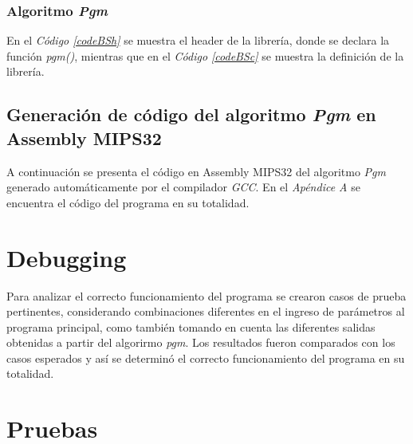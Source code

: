 \documentclass{article}
\newcommand{\refcode}[1]{\textit{Código \ref{#1}}}
\begin{document}
\subsubsection{Algoritmo \textit{Pgm}}

	En el \refcode{codeBSh} se muestra el header de la librería, donde se declara la función \textit{pgm()}, mientras que en el \refcode{codeBSc} se muestra la definición de la librería.

\lstset{ language = C } %
 
\medskip


\lstset{ language = C } %
 
\bigskip\bigskip




\subsection{Generación de código del algoritmo \textit{Pgm} en Assembly MIPS32}

	A continuación se presenta el código en Assembly MIPS32 del algoritmo \textit{Pgm} generado automáticamente por el compilador \textit{GCC}. En el \textit{Apéndice A}	 se encuentra el código del programa en su totalidad.
	\medskip

\lstset{ language = [mips]Assembler } %
 
\bigskip\bigskip



\section{Debugging}
	
	Para analizar el correcto funcionamiento del programa se crearon casos de prueba pertinentes, considerando combinaciones diferentes en el ingreso de parámetros al programa principal, como también tomando en cuenta las diferentes salidas obtenidas a partir del algorirmo \textit{pgm}. Los resultados fueron comparados con los casos esperados y así se determinó el correcto funcionamiento del programa en su totalidad.
\bigskip\bigskip




\section{Pruebas}
\end{document}
